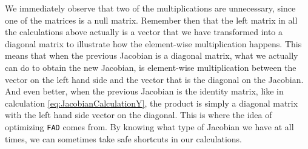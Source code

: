 We immediately observe that two of the multiplications are unnecessary, since one of the matrices is a null matrix. Remember then that the left matrix in all the calculations above actually is a vector that we have transformed into a diagonal matrix to illustrate how the element-wise multiplication happens. This means that when the previous Jacobian is a diagonal matrix, what we actually can do to obtain the new Jacobian, is element-wise multiplication between the vector on the left hand side and the vector that is the diagonal on the Jacobian. And even better, when the previous Jacobian is the identity matrix, like in calculation \eqref{eq:JacobianCalculationY}, the product is simply a diagonal matrix with the left hand side vector on the diagonal. This is where the idea of optimizing \texttt{FAD} comes from. By knowing what type of Jacobian we have at all times, we can sometimes take safe shortcuts in our calculations. 

